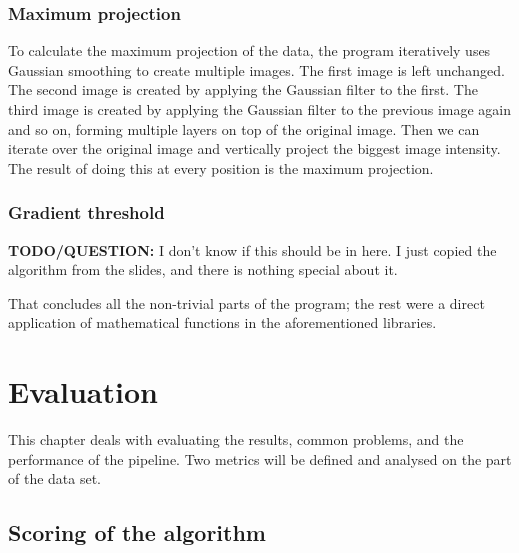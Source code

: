 \documentclass[
  digital,     %
  oneside,     %
  nosansbold,  %
  nocolorbold, %
  lof,         %
  lot,         %
]{fithesis4}
\begin{document}
\subsection{Maximum projection} 
\label{sec:max-proj}
To calculate the maximum projection of the data, the program iteratively uses
Gaussian smoothing to create multiple images. The first image is left unchanged.
The second image is created by applying the Gaussian filter to the first. The
third image is created by applying the Gaussian filter to the previous image
again and so on, forming multiple layers on top of the original image. Then we can
iterate over the original image and vertically project the biggest image intensity.
The result of doing this at every position is the maximum projection.

\subsection{Gradient threshold}
\textbf{TODO/QUESTION:} I don't know if this should be in here. I just copied the
algorithm from the slides, and there is nothing special about it.

That concludes all the non-trivial parts of the program; the rest were a direct
application of mathematical functions in the aforementioned libraries.

\chapter{Evaluation}
\label{chp:evaluation}
This chapter deals with evaluating the results, common problems, and the
performance of the pipeline. Two metrics will be defined and analysed on the part of
the data set.

\section{Scoring of the algorithm}
\end{document}
